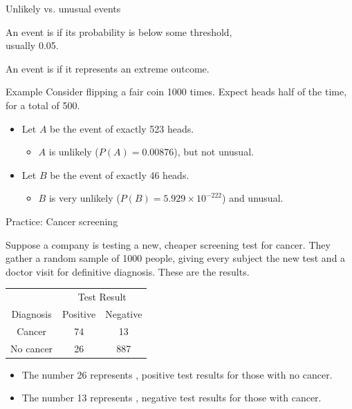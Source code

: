 \documentclass[xcolor=table]{beamer}
\begin{document}
\begin{frame}{Unlikely vs. unusual events}
\begin{block}{}
\large An event is  if its probability is below some threshold,\\ usually 0.05.
\end{block}

\begin{block}{}
\large An event is  if it represents an extreme outcome.
\end{block}

\pause

\begin{exampleblock}{Example}
Consider flipping a fair coin 1000 times. Expect heads half of the time, for a total of 500.

\begin{itemize}
\pause
\item Let $A$ be the event of exactly 523 heads.
\begin{itemize}
\pause
\item $A$ is unlikely ($P(A) = 0.00876$), but not unusual.
\end{itemize}

\pause
\item  Let $B$ be the event of exactly 46 heads.
\begin{itemize}
\pause
\item $B$ is very unlikely ($P(B) = 5.929 \times 10^{-222}$) and unusual.
\end{itemize}
\end{itemize}
\end{exampleblock}
\end{frame}

\begin{frame}{Practice: Cancer screening}
\begin{block}{}
Suppose a company is testing a new, cheaper screening test for cancer. They gather a random sample of 1000 people, giving every subject the new test and a doctor visit for definitive diagnosis. These are the results.\\
\medskip
{\centering
\begin{tabular}{c | c  c}
\multicolumn{1}{c}{} & \multicolumn{2}{c}{Test Result}\\
Diagnosis & Positive & Negative\\
\hline
Cancer & 74 & 13\\
No cancer & 26 & 887 \\
\end{tabular}\par
}
\smallskip
\begin{itemize}
\pause
\item The number 26 represents , positive test results for those with no cancer.
\pause
\item The number 13 represents , negative test results for those with cancer.
\end{itemize}
\end{block}
\end{frame}
\end{document}
